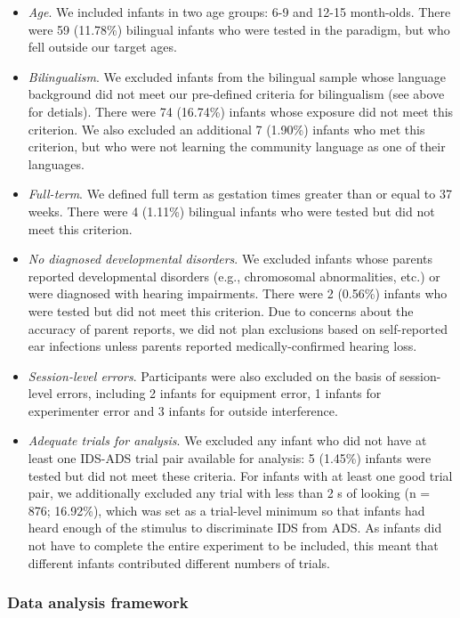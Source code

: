 \documentclass[english,,man,floatsintext]{apa6}
\begin{document}
\begin{itemize}
\item
  \emph{Age}. We included infants in two age groups: 6-9 and 12-15 month-olds. There were 59 (11.78\%) bilingual infants who were tested in the paradigm, but who fell outside our target ages.
\item
  \emph{Bilingualism}. We excluded infants from the bilingual sample whose language background did not meet our pre-defined criteria for bilingualism (see above for detials). There were 74 (16.74\%) infants whose exposure did not meet this criterion. We also excluded an additional 7 (1.90\%) infants who met this criterion, but who were not learning the community language as one of their languages.
\item
  \emph{Full-term}. We defined full term as gestation times greater than or equal to 37 weeks. There were 4 (1.11\%) bilingual infants who were tested but did not meet this criterion.
\item
  \emph{No diagnosed developmental disorders}. We excluded infants whose parents reported developmental disorders (e.g., chromosomal abnormalities, etc.) or were diagnosed with hearing impairments. There were 2 (0.56\%) infants who were tested but did not meet this criterion. Due to concerns about the accuracy of parent reports, we did not plan exclusions based on self-reported ear infections unless parents reported medically-confirmed hearing loss.
\item
  \emph{Session-level errors}. Participants were also excluded on the basis of session-level errors, including 2 infants for equipment error, 1 infants for experimenter error and 3 infants for outside interference.
\item
  \emph{Adequate trials for analysis}. We excluded any infant who did not have at least one IDS-ADS trial pair available for analysis: 5 (1.45\%) infants were tested but did not meet these criteria. For infants with at least one good trial pair, we additionally excluded any trial with less than 2 s of looking (n = 876; 16.92\%), which was set as a trial-level minimum so that infants had heard enough of the stimulus to discriminate IDS from ADS. As infants did not have to complete the entire experiment to be included, this meant that different infants contributed different numbers of trials.
\end{itemize}

\hypertarget{data-analysis-framework}{%
\subsubsection{Data analysis framework}\label{data-analysis-framework}}
\end{document}
